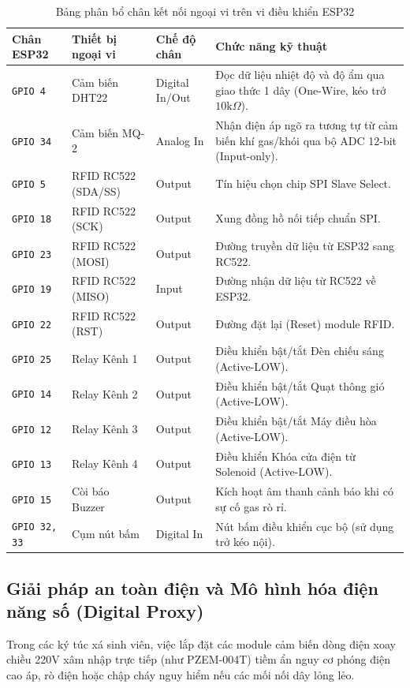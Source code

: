 \begin{table}[H]
\centering
\caption{Bảng phân bổ chân kết nối ngoại vi trên vi điều khiển ESP32}
\label{tab:esp32_pinout}
\begin{tabular}{|l|l|l|p{6.8cm}|}
\hline
\textbf{Chân ESP32} & \textbf{Thiết bị ngoại vi} & \textbf{Chế độ chân} & \textbf{Chức năng kỹ thuật} \\
\hline
\texttt{GPIO 4} & Cảm biến DHT22 & Digital In/Out & Đọc dữ liệu nhiệt độ và độ ẩm qua giao thức 1 dây (One-Wire, kéo trở $10\text{k}\Omega$). \\
\hline
\texttt{GPIO 34} & Cảm biến MQ-2 & Analog In & Nhận điện áp ngõ ra tương tự từ cảm biến khí gas/khói qua bộ ADC 12-bit (Input-only). \\
\hline
\texttt{GPIO 5} & RFID RC522 (SDA/SS) & Output & Tín hiệu chọn chip SPI Slave Select. \\
\hline
\texttt{GPIO 18} & RFID RC522 (SCK) & Output & Xung đồng hồ nối tiếp chuẩn SPI. \\
\hline
\texttt{GPIO 23} & RFID RC522 (MOSI) & Output & Đường truyền dữ liệu từ ESP32 sang RC522. \\
\hline
\texttt{GPIO 19} & RFID RC522 (MISO) & Input & Đường nhận dữ liệu từ RC522 về ESP32. \\
\hline
\texttt{GPIO 22} & RFID RC522 (RST) & Output & Đường đặt lại (Reset) module RFID. \\
\hline
\texttt{GPIO 25} & Relay Kênh 1 & Output & Điều khiển bật/tắt Đèn chiếu sáng (Active-LOW). \\
\hline
\texttt{GPIO 14} & Relay Kênh 2 & Output & Điều khiển bật/tắt Quạt thông gió (Active-LOW). \\
\hline
\texttt{GPIO 12} & Relay Kênh 3 & Output & Điều khiển bật/tắt Máy điều hòa (Active-LOW). \\
\hline
\texttt{GPIO 13} & Relay Kênh 4 & Output & Điều khiển Khóa cửa điện từ Solenoid (Active-LOW). \\
\hline
\texttt{GPIO 15} & Còi báo Buzzer & Output & Kích hoạt âm thanh cảnh báo khi có sự cố gas rò rỉ. \\
\hline
\texttt{GPIO 32, 33} & Cụm nút bấm & Digital In & Nút bấm điều khiển cục bộ (sử dụng trở kéo nội). \\
\hline
\end{tabular}
\end{table}

\subsection{Giải pháp an toàn điện và Mô hình hóa điện năng số (Digital Proxy)}
Trong các ký túc xá sinh viên, việc lắp đặt các module cảm biến dòng điện xoay chiều 220V xâm nhập trực tiếp (như PZEM-004T) tiềm ẩn nguy cơ phóng điện cao áp, rò điện hoặc chập cháy nguy hiểm nếu các mối nối dây lỏng lẻo. 

